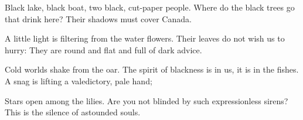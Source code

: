 \documentclass[12pt, letterpaper]{report}
\begin{document}
\begin{poem}
\begin{stanza}
Black lake, black boat, two black, cut-paper people.\verseline
Where do the black trees go that drink here?\verseline
Their shadows must cover Canada.
\end{stanza}
\begin{stanza}
A little light is filtering from the water flowers.\verseline
Their leaves do not wish us to hurry:\verseline
They are round and flat and full of dark advice.
\end{stanza}
\begin{stanza}
Cold worlds shake from the oar.\verseline
The spirit of blackness is in us, it is in the fishes.\verseline
A snag is lifting a valedictory, pale hand;
\end{stanza}
\begin{stanza}
Stars open among the lilies.\verseline
Are you not blinded by such expressionless sirens?\verseline
This is the silence of astounded souls.
\end{stanza}
\end{poem}












  
  
\end{document}
